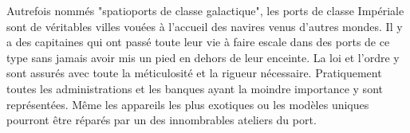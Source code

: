 \documentclass{article}
\begin{document}
Autrefois nommés "spatioports de classe galactique", les ports de classe Impériale sont de véritables villes vouées à l'accueil des navires venus d'autres mondes. Il y a des capitaines qui ont passé toute leur vie à faire escale dans des ports de ce type sans jamais avoir mis un pied en dehors de leur enceinte. La loi et l'ordre y sont assurés avec toute la méticulosité et la rigueur nécessaire. Pratiquement toutes les administrations et les banques ayant la moindre importance y sont représentées. Même les appareils les plus exotiques ou les modèles uniques pourront être réparés par un des innombrables ateliers du port. 
\end{document}
